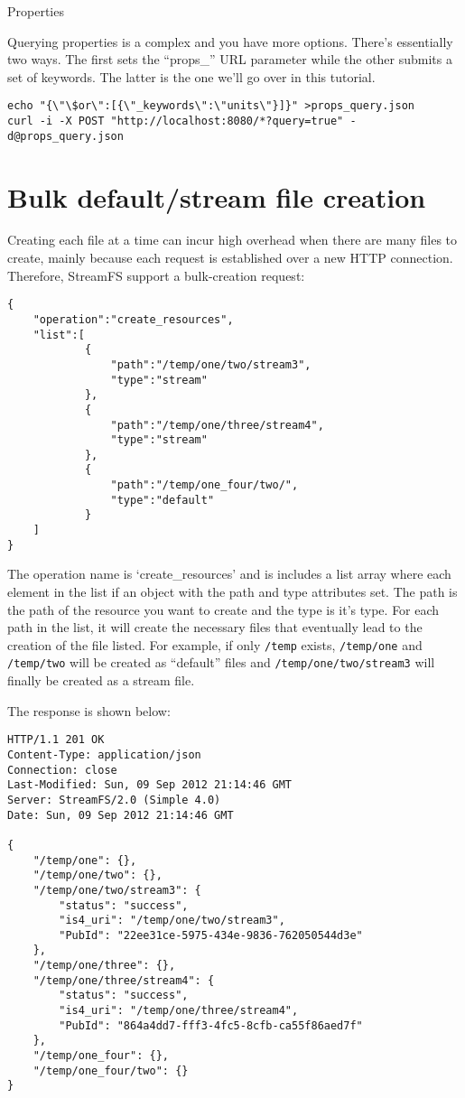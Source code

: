 Properties

Querying properties is a complex and you have more options. There's essentially two ways. The first sets the ``props\_'' URL 
parameter while the other submits a set of keywords. The latter is the one we'll go over in this tutorial.

\begin{lstlisting}
echo "{\"\$or\":[{\"_keywords\":\"units\"}]}" >props_query.json
curl -i -X POST "http://localhost:8080/*?query=true" -d@props_query.json
\end{lstlisting}

\section{Bulk default/stream file creation}

Creating each file at a time can incur high overhead when there are many files to create, mainly because each request is established over a new HTTP connection. Therefore, StreamFS support a bulk-creation request:

\begin{lstlisting}
{   
    "operation":"create_resources",
    "list":[
            {
                "path":"/temp/one/two/stream3", 
                "type":"stream"
            },
            {
                "path":"/temp/one/three/stream4", 
                "type":"stream"
            },
            {
                "path":"/temp/one_four/two/", 
                "type":"default"
            }
    ]
}
\end{lstlisting}

The operation name is `create\_resources' and is includes a list array where each element in the list if an 
object with the path and type attributes set. The path is the path of the resource you want to create and the 
type is it's type. For each path in the list, it will create the necessary files that eventually lead to the 
creation of the file listed. For example, if only \texttt{/temp} exists, \texttt{/temp/one} and \texttt{/temp/two}
 will be created as 
``default'' files and \texttt{/temp/one/two/stream3} will finally be created as a stream file.

The response is shown below:

\begin{lstlisting}
HTTP/1.1 201 OK
Content-Type: application/json
Connection: close
Last-Modified: Sun, 09 Sep 2012 21:14:46 GMT
Server: StreamFS/2.0 (Simple 4.0)
Date: Sun, 09 Sep 2012 21:14:46 GMT

{
    "/temp/one": {},
    "/temp/one/two": {},
    "/temp/one/two/stream3": {
        "status": "success",
        "is4_uri": "/temp/one/two/stream3",
        "PubId": "22ee31ce-5975-434e-9836-762050544d3e"
    },
    "/temp/one/three": {},
    "/temp/one/three/stream4": {
        "status": "success",
        "is4_uri": "/temp/one/three/stream4",
        "PubId": "864a4dd7-fff3-4fc5-8cfb-ca55f86aed7f"
    },
    "/temp/one_four": {},
    "/temp/one_four/two": {}
}
\end{lstlisting}

